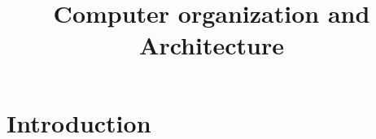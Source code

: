\documentclass{article}
\title{Computer organization and Architecture}
\begin{document}
\maketitle

\section{Introduction}
\end{document}
